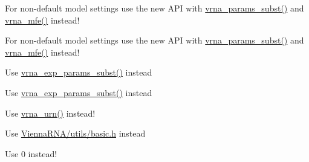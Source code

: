 \begin{DoxyRefList}
%
For non-\/default model settings use the new A\+PI with \mbox{\hyperlink{group__energy__parameters_ga5d1909208f7ea3baa98b75afaa1f62ca}{vrna\+\_\+params\+\_\+subst()}} and \mbox{\hyperlink{group__mfe__global_gabd3b147371ccf25c577f88bbbaf159fd}{vrna\+\_\+mfe()}} instead! 
\item[Global \mbox{\hyperlink{group__mfe__global__deprecated_gae66dc422efb8f5d56717d92d6002a9f8}{update\+\_\+fold\+\_\+params\+\_\+par}} (vrna\+\_\+param\+\_\+t $\ast$parameters)]\label{deprecated__deprecated000071}%
%
For non-\/default model settings use the new A\+PI with \mbox{\hyperlink{group__energy__parameters_ga5d1909208f7ea3baa98b75afaa1f62ca}{vrna\+\_\+params\+\_\+subst()}} and \mbox{\hyperlink{group__mfe__global_gabd3b147371ccf25c577f88bbbaf159fd}{vrna\+\_\+mfe()}} instead! 
\item[Global \mbox{\hyperlink{group__part__func__global__deprecated_ga384e927890f9c034ff09fa66da102d28}{update\+\_\+pf\+\_\+params}} (int length)]\label{deprecated__deprecated000101}%
%
Use \mbox{\hyperlink{group__energy__parameters_ga8e7ac4fab3b0cc03afbc134eaafb3525}{vrna\+\_\+exp\+\_\+params\+\_\+subst()}} instead 
\item[Global \mbox{\hyperlink{group__part__func__global__deprecated_gaafe2d1b21f5418b123b088aa395e827d}{update\+\_\+pf\+\_\+params\+\_\+par}} (int length, vrna\+\_\+exp\+\_\+param\+\_\+t $\ast$parameters)]\label{deprecated__deprecated000102}%
%
Use \mbox{\hyperlink{group__energy__parameters_ga8e7ac4fab3b0cc03afbc134eaafb3525}{vrna\+\_\+exp\+\_\+params\+\_\+subst()}} instead 
\item[Global \mbox{\hyperlink{utils_2basic_8h_aaa328491c84996e445d027fde9800f2e}{urn}} (void)]\label{deprecated__deprecated000188}%
%
Use \mbox{\hyperlink{group__utils_ga384e256ebb295d04a14426179db0dd6e}{vrna\+\_\+urn()}} instead!  
\item[File \mbox{\hyperlink{utils_8h}{utils.h}} ]\label{deprecated__deprecated000138}%
%
Use \mbox{\hyperlink{utils_2basic_8h}{Vienna\+R\+N\+A/utils/basic.\+h}} instead  
\item[Global \mbox{\hyperlink{group__constraints_ga62e0ed0c33002c09423de4e646f85a2b}{V\+R\+N\+A\+\_\+\+C\+O\+N\+S\+T\+R\+A\+I\+N\+T\+\_\+\+F\+I\+LE}} ]\label{deprecated__deprecated000154}%
%
Use 0 instead!



\end{DoxyRefList}
